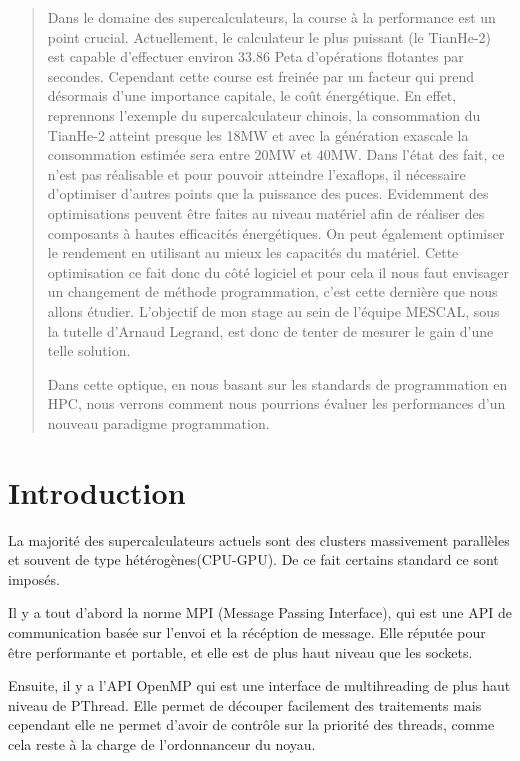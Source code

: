 \documentclass[smallextended]{svjour3}
\begin{document}
\begin{abstract}
Dans le domaine des supercalculateurs, la course à la performance est
un point crucial. Actuellement, le calculateur le plus puissant (le
TianHe-2) est capable d'effectuer environ 33.86 Peta d'opérations
flotantes par secondes. Cependant cette course est freinée par un
facteur qui prend désormais d'une importance capitale, le coût
énergétique. En effet, reprennons l'exemple du supercalculateur
chinois, la consommation du TianHe-2 atteint presque les 18MW et
avec la génération exascale la consommation estimée sera entre 20MW
et 40MW. Dans l'état des fait, ce n'est pas réalisable et pour
pouvoir atteindre l'exaflops, il nécessaire d'optimiser d'autres
points que la puissance des puces. Evidemment des optimisations
peuvent être faites au niveau matériel afin de réaliser des
composants à hautes efficacités énergétiques. On peut également
optimiser le rendement en utilisant au mieux les capacités du
matériel. Cette optimisation ce fait donc du côté logiciel et pour
cela il nous faut  envisager un changement de méthode programmation,
c'est cette dernière que nous allons étudier. L'objectif de mon
stage au sein de l'équipe MESCAL, sous la tutelle d'Arnaud Legrand,
est donc de tenter de mesurer le gain d'une telle solution. 


Dans cette optique, en nous basant sur les standards de
programmation en HPC, nous verrons comment nous pourrions évaluer
les performances d'un nouveau paradigme programmation.
\end{abstract}

\section{Introduction}
\label{sec-1}

La majorité des supercalculateurs actuels sont des clusters
massivement parallèles et souvent de type hétérogènes(CPU-GPU). De
ce fait certains standard ce sont imposés. 

Il y a tout d'abord la norme MPI (Message Passing Interface),
qui est une API de communication basée sur l'envoi et la
récéption de message. Elle réputée pour être performante et
portable, et elle est de plus haut niveau que les sockets.

Ensuite, il y a l'API OpenMP qui est une interface de
multihreading de plus haut niveau de PThread. Elle permet de
découper facilement des traitements mais cependant elle ne permet
d'avoir de contrôle sur la priorité des threads, comme cela reste à
la charge de l'ordonnanceur du noyau. 
\end{document}

